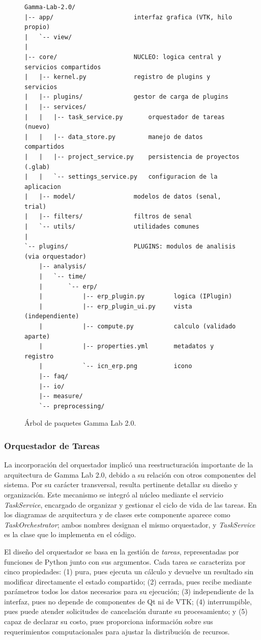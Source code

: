 \documentclass[12pt,letterpaper,oneside]{article}
\begin{document}
\begin{figure}[H]
\centering
\begin{lstlisting}
Gamma-Lab-2.0/
|-- app/                      interfaz grafica (VTK, hilo propio)
|   `-- view/
|
|-- core/                     NUCLEO: logica central y servicios compartidos
|   |-- kernel.py             registro de plugins y servicios
|   |-- plugins/              gestor de carga de plugins
|   |-- services/
|   |   |-- task_service.py       orquestador de tareas (nuevo)
|   |   |-- data_store.py         manejo de datos compartidos
|   |   |-- project_service.py    persistencia de proyectos (.glab)
|   |   `-- settings_service.py   configuracion de la aplicacion
|   |-- model/                modelos de datos (senal, trial)
|   |-- filters/              filtros de senal
|   `-- utils/                utilidades comunes
|
`-- plugins/                  PLUGINS: modulos de analisis (via orquestador)
    |-- analysis/
    |   `-- time/
    |       `-- erp/
    |           |-- erp_plugin.py        logica (IPlugin)
    |           |-- erp_plugin_ui.py     vista (independiente)
    |           |-- compute.py           calculo (validado aparte)
    |           |-- properties.yml       metadatos y registro
    |           `-- icn_erp.png          icono
    |-- faq/
    |-- io/
    |-- measure/
    `-- preprocessing/
\end{lstlisting}
\caption{Árbol de paquetes Gamma Lab 2.0. }
\label{fig:estructura-archivos}
\end{figure}

\subsubsection{Orquestador de Tareas}

La incorporación del orquestador implicó una reestructuración importante de la arquitectura de Gamma Lab 2.0, debido a su relación con otros componentes del sistema. Por su carácter transversal, resulta pertinente detallar su diseño y organización. Este mecanismo se integró al núcleo mediante el servicio \textit{TaskService}, encargado de organizar y gestionar el ciclo de vida de las tareas. En los diagramas de arquitectura y de clases este componente aparece como \textit{TaskOrchestrator}; ambos nombres designan el mismo orquestador, y \textit{TaskService} es la clase que lo implementa en el código.

El diseño del orquestador se basa en la gestión de \textit{tareas}, representadas por funciones de Python junto con sus argumentos. Cada tarea se caracteriza por cinco propiedades: (1) pura, pues ejecuta un cálculo y devuelve un resultado sin modificar directamente el estado compartido; (2) cerrada, pues recibe mediante parámetros todos los datos necesarios para su ejecución; (3) independiente de la interfaz, pues no depende de componentes de Qt ni de VTK; (4) interrumpible, pues puede atender solicitudes de cancelación durante su procesamiento; y (5) capaz de declarar su costo, pues proporciona información sobre sus requerimientos computacionales para ajustar la distribución de recursos.
\end{document}
